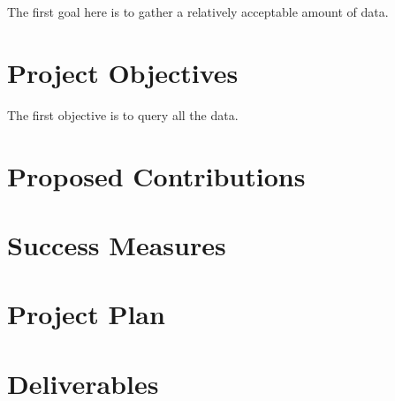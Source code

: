 \documentclass[11pt]{article}
\begin{document}
The first goal here is to gather a relatively acceptable amount of data.


\section{Project Objectives}
The first objective is to query all the data.


\section{Proposed Contributions}
\section{Success Measures}
\section{Project Plan}
\section{Deliverables}


    
    
\end{document}
